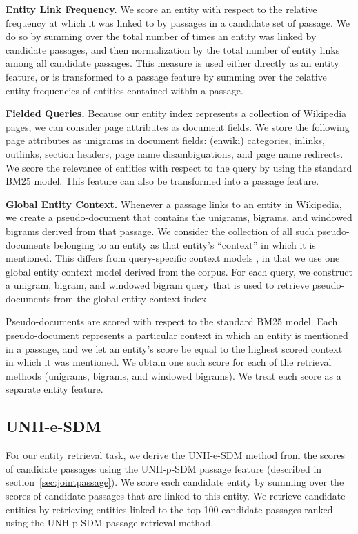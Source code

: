 \documentclass{article}
\begin{document}
\textbf{Entity Link Frequency. } We score an entity with respect to the relative frequency at which it was linked to by passages in a candidate set of passage. We do so by summing over the total number of times an entity was linked by candidate passages, and then normalization by the total number of entity links among all candidate passages. This measure is used either directly as an entity feature, or is transformed to a passage feature by summing over the relative entity frequencies of entities contained within a passage. 


\textbf{Fielded Queries.} Because our entity index represents a collection of Wikipedia pages, we can consider page attributes as document fields. We store the following page attributes as unigrams in document fields: (enwiki) categories, inlinks, outlinks, section headers, page name disambiguations, and page name redirects. We score the relevance of entities with respect to the query by using the standard BM25 model.  This feature can also be transformed into a passage feature.


\textbf{Global Entity Context.} Whenever a passage links to an entity in Wikipedia, we create a pseudo-document that contains the unigrams, bigrams, and windowed bigrams derived from that passage.  We consider the collection of all such pseudo-documents belonging to an entity as that entity's ``context'' in which it is mentioned. This differs from query-specific context models  \cite{dalton2014entity}, in that we use one global entity context model derived from the corpus. For each query, we construct a unigram, bigram, and windowed bigram query that is used to retrieve pseudo-documents from the global entity context index. 

Pseudo-documents are scored with respect to the standard BM25 model.
Each pseudo-document represents a particular context in which an entity is mentioned in a passage, and we let an entity's score be equal to the highest scored context in which it was mentioned. We obtain one such score for each of the retrieval methods (unigrams, bigrams, and windowed bigrams). We treat each score as a separate entity feature.

\subsection{UNH-e-SDM}\label{sec:esdm}

For our entity retrieval task, we derive the UNH-e-SDM method from the scores of candidate passages using the UNH-p-SDM passage feature (described in section~\ref{sec:jointpassage}). We score each candidate entity by summing over the scores of candidate passages that are linked to this entity. We retrieve candidate entities by retrieving entities linked to the top 100 candidate passages ranked using the UNH-p-SDM passage retrieval method. 
\end{document}
